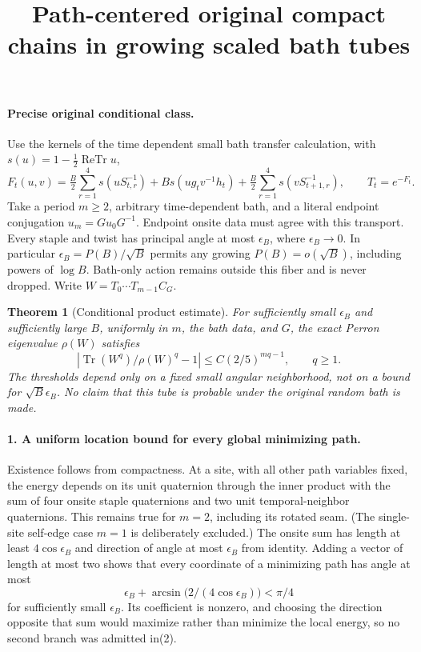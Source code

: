 \documentclass[11pt]{article}
\title{Path-centered original compact chains in growing scaled bath tubes}\author{}\date{}
\newtheorem{theorem}{Theorem}
\begin{document}
\maketitle
\paragraph{Precise original conditional class.}
Use the kernels of the time dependent small bath transfer calculation, with $s(u)=1-\frac12\operatorname{ReTr}u$,
\[
 F_t(u,v)=\tfrac B2\sum_{r=1}^4s(uS_{t,r}^{-1})+
 Bs(ug_tv^{-1}h_t)+\tfrac B2\sum_{r=1}^4s(vS_{t+1,r}^{-1}),\qquad T_t=e^{-F_t}.
\]
Take a period $m\ge2$, arbitrary time-dependent bath, and a literal endpoint
conjugation $u_m=G u_0G^{-1}$. Endpoint onsite data must agree with this transport.
Every staple and twist has principal angle at most $\epsilon_B$, where
$\epsilon_B\to0$. In particular $\epsilon_B=P(B)/\sqrt B$ permits any growing
$P(B)=o(\sqrt B)$, including powers of $\log B$. Bath-only action remains outside
this fiber and is never dropped. Write $W=T_0\cdots T_{m-1}C_G$.

\begin{theorem}[Conditional product estimate]
For sufficiently small $\epsilon_B$ and sufficiently large $B$, uniformly in
$m$, the bath data, and $G$, the exact Perron eigenvalue $\rho(W)$ satisfies
\[
 \left|\operatorname{Tr}(W^q)/\rho(W)^q-1\right|
       \le C(2/5)^{mq-1},\qquad q\ge1.                                  \tag{1}
\]
The thresholds depend only on a fixed small angular neighborhood, not on a
bound for $\sqrt B\epsilon_B$. No claim that this tube is probable under the
original random bath is made.
\end{theorem}

\paragraph{1. A uniform location bound for every global minimizing path.}
Existence follows from compactness. At a site, with all other path variables
fixed, the energy depends on its unit quaternion through the inner product
with the sum of four onsite staple quaternions and two unit temporal-neighbor
quaternions. This remains true for $m=2$, including its rotated seam. (The
single-site self-edge case $m=1$ is deliberately excluded.) The onsite sum has
length at least $4\cos\epsilon_B$ and direction of angle at most $\epsilon_B$
from identity. Adding a vector of length at most two shows that every
coordinate of a minimizing path has angle at most
\[
 \epsilon_B+\arcsin\bigl(2/(4\cos\epsilon_B)\bigr)<\pi/4                  \tag{2}
\]
for sufficiently small $\epsilon_B$. Its coefficient is nonzero, and choosing
the direction opposite that sum would maximize rather than minimize the local
energy, so no second branch was admitted in(2).
\end{document}
